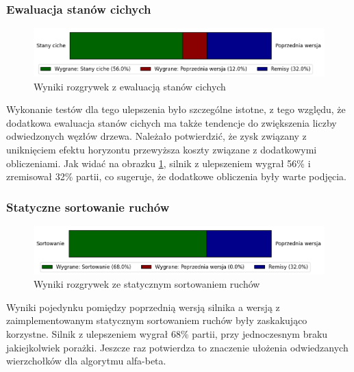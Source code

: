 \subsubsection{Ewaluacja stanów cichych}
\begin{figure}[ht]
    \centering
    \includegraphics[width=1\linewidth]{rozdzialy/rozdzial03/1_porownanie-wersji-silnika/rysunki/wyniki-stany-ciche}
    \caption{Wyniki rozgrywek z ewaluacją stanów cichych}
    \label{fig:wyniki-stany-ciche}
\end{figure}
Wykonanie testów dla tego ulepszenia było szczególne istotne, z tego względu, że dodatkowa ewaluacja stanów cichych ma także tendencje do zwiększenia liczby odwiedzonych węzłów drzewa.
Należało potwierdzić, że zysk związany z uniknięciem efektu horyzontu przewyższa koszty związane z dodatkowymi obliczeniami.
Jak widać na obrazku \ref{fig:wyniki-stany-ciche}, silnik z ulepszeniem wygrał 56\% i zremisował 32\% partii, co sugeruje, że dodatkowe obliczenia były warte podjęcia.


\subsubsection{Statyczne sortowanie ruchów}
\begin{figure}[ht]
    \centering
    \includegraphics[width=1\linewidth]{rozdzialy/rozdzial03/1_porownanie-wersji-silnika/rysunki/wyniki-sortowanie}
    \caption{Wyniki rozgrywek ze statycznym sortowaniem ruchów}
    \label{fig:wyniki-sortowanie}
\end{figure}
Wyniki pojedynku pomiędzy poprzednią wersją silnika a wersją z zaimplementowanym statycznym sortowaniem ruchów były zaskakująco korzystne.
Silnik z ulepszeniem wygrał 68\% partii, przy jednoczesnym braku jakiejkolwiek porażki.
Jeszcze raz potwierdza to znaczenie ułożenia odwiedzanych wierzchołków dla algorytmu alfa-beta.

